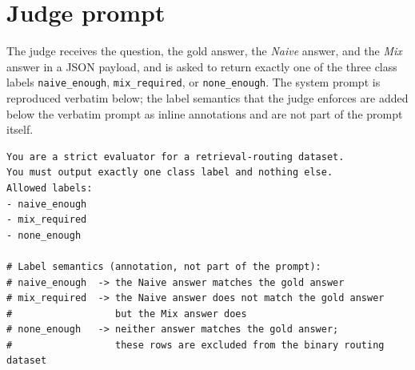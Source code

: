 \documentclass[english, bibtex]{kththesis}               %
\numberwithin{listing}{chapter}
\begin{document}
\section{Judge prompt}
\label{app:judgePrompt}

The judge receives the question, the gold answer, the \emph{Naive} answer, and the \emph{Mix} answer in a JSON payload, and is asked to return exactly one of the three class labels \texttt{naive\_enough}, \texttt{mix\_required}, or \texttt{none\_enough}. The system prompt is reproduced verbatim below; the label semantics that the judge enforces are added below the verbatim prompt as inline annotations and are not part of the prompt itself.

\begin{lstlisting}[basicstyle=\ttfamily\small,breaklines=true,columns=fullflexible]
You are a strict evaluator for a retrieval-routing dataset.
You must output exactly one class label and nothing else.
Allowed labels:
- naive_enough
- mix_required
- none_enough

# Label semantics (annotation, not part of the prompt):
# naive_enough  -> the Naive answer matches the gold answer
# mix_required  -> the Naive answer does not match the gold answer
#                  but the Mix answer does
# none_enough   -> neither answer matches the gold answer;
#                  these rows are excluded from the binary routing dataset
\end{lstlisting}

\cleardoublepage

\label{pg:lastPageofMainmatter}

\cleardoublepage
\clearpage\thispagestyle{empty}\mbox{} %
\kthbackcover
\end{document}
